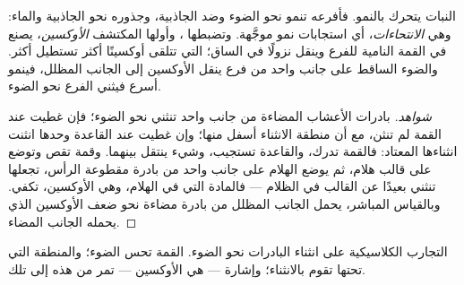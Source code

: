 \begin{proposition}\label{prop:g12:plant-rooted-life:tropisms}
النبات يتحرك بالنمو. فأفرعه تنمو نحو الضوء وضد الجاذبية، وجذوره نحو
الجاذبية والماء: وهي \emph{الانتحاءات}، أي استجابات
نمو موجَّهة. وتضبطها ، وأولها المكتشف \emph{الأوكسين}، يصنع في
القمة النامية للفرع وينقل نزولًا في الساق؛  التي تتلقى أوكسينًا
أكثر تستطيل أكثر. والضوء الساقط على جانب واحد من فرع ينقل الأوكسين
إلى الجانب المظلل، فينمو أسرع فيثني الفرع نحو الضوء.
\end{proposition}
\begin{proof}[شواهد]
بادرات الأعشاب المضاءة من جانب واحد تنثني نحو الضوء؛ فإن غطيت عند
القمة لم تنثن، مع أن منطقة الانثناء أسفل منها؛ وإن غطيت عند القاعدة
وحدها انثنت انثناءها المعتاد: فالقمة تدرك، والقاعدة تستجيب، وشيء ينتقل
بينهما. وقمة تقص وتوضع على قالب هلام، ثم يوضع الهلام على جانب واحد من
بادرة مقطوعة الرأس، تجعلها تنثني بعيدًا عن القالب في الظلام --- فالمادة
التي في الهلام، وهي الأوكسين، تكفي. وبالقياس المباشر، يحمل الجانب
المظلل من بادرة مضاءة نحو ضعف الأوكسين الذي يحمله الجانب المضاء.
\end{proof}

\begin{omfigure}

{\small التجارب الكلاسيكية على انثناء البادرات نحو الضوء. القمة تحس
الضوء؛ والمنطقة التي تحتها تقوم بالانثناء؛ وإشارة --- هي الأوكسين ---
تمر من هذه إلى تلك.}
\end{omfigure}

